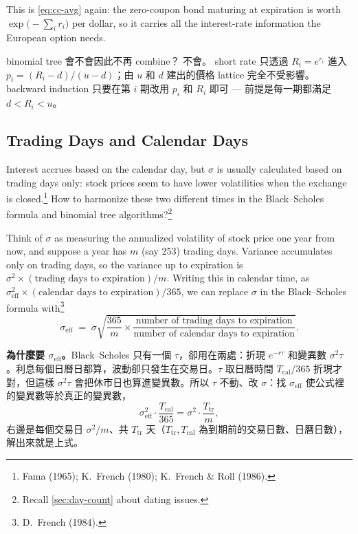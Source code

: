 This is \eqref{eq:cc-avg} again: the zero-coupon bond maturing at expiration is worth $\exp\bigl(-\sum_{i}r_{i}\bigr)$ per dollar, so it carries all the interest-rate information the European option needs.

\begin{note}
	binomial tree 會不會因此不再 combine？
	不會。
	short rate 只透過 $R_{i}=e^{r_{i}}$ 進入 $p_{i}=(R_{i}-d)/(u-d)$；由 $u$ 和 $d$ 建出的價格 lattice 完全不受影響。
	backward induction 只要在第 $i$ 期改用 $p_{i}$ 和 $R_{i}$ 即可 --- 前提是每一期都滿足 $d<R_{i}<u$。
\end{note}
\suppend

\subsection{Trading Days and Calendar Days}


Interest accrues based on the calendar day, but $\sigma$ is usually calculated based on trading days only: stock prices seem to have lower volatilities when the exchange is closed.\footnote{Fama (1965); K.~French (1980); K.~French \& Roll (1986).}
How to harmonize these two different times in the Black--Scholes formula and binomial tree algorithms?\footnote{Recall \autoref{sec:day-count} about dating issues.}

Think of $\sigma$ as measuring the annualized volatility of stock price one year from now, and suppose a year has $m$ (say 253) trading days.
\suppstart
Variance accumulates only on trading days, so the variance up to expiration is $\sigma^{2}\times(\text{trading days to expiration})/m$.
\suppend
Writing this in calendar time, as $\sigma_{\mathrm{eff}}^{2}\times(\text{calendar days to expiration})/365$, we can replace $\sigma$ in the Black--Scholes formula with\footnote{D.~French (1984).}
\[
	\sigma_{\mathrm{eff}} \;=\; \sigma\sqrt{\frac{365}{m}\times\frac{\text{number of trading days to expiration}}{\text{number of calendar days to expiration}}} .
\]

\suppstart
\begin{remark}
	\textbf{為什麼要 $\sigma_{\mathrm{eff}}$。}Black--Scholes 只有一個 $\tau$，卻用在兩處：折現 $e^{-r\tau}$ 和變異數 $\sigma^{2}\tau$。利息每個日曆日都算，波動卻只發生在交易日。$\tau$ 取日曆時間 $T_{\mathrm{cal}}/365$ 折現才對，但這樣 $\sigma^{2}\tau$ 會把休市日也算進變異數。所以 $\tau$ 不動、改 $\sigma$：找 $\sigma_{\mathrm{eff}}$ 使公式裡的變異數等於真正的變異數，
	\[
		\sigma_{\mathrm{eff}}^{2}\cdot\frac{T_{\mathrm{cal}}}{365}=\sigma^{2}\cdot\frac{T_{\mathrm{tr}}}{m} ,
	\]
	右邊是每個交易日 $\sigma^{2}/m$、共 $T_{\mathrm{tr}}$ 天（$T_{\mathrm{tr}},T_{\mathrm{cal}}$ 為到期前的交易日數、日曆日數），解出來就是上式。
\end{remark}
\suppend

